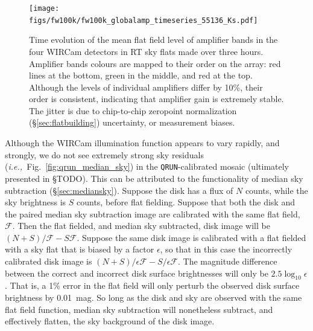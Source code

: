 \documentclass[iop]{emulateapj}
\newcommand{\ie}{\textit{i.e.,~}}
\newcommand{\todo}[1]{\textcolor{RedOrange}{#1}} %
\newcommand{\Fig}[1]{Fig.~\ref{fig:#1}}  %
\newcommand{\Sec}[1]{\S\ref{sec:#1}}  %
\begin{document}
\begin{figure}[t]
\centering
\texttt{[image: figs/fw100k/fw100k\_globalamp\_timeseries\_55136\_Ks.pdf]}
\caption{Time evolution of the mean flat field level of amplifier bands in the four WIRCam detectors in RT sky flats made over three hours. Amplifier bands colours are mapped to their order on the array: red lines at the bottom, green in the middle, and red at the top. Although the levels of individual amplifiers differ by 10\%, their order is consistent, indicating that amplifier gain is extremely stable. The jitter is due to chip-to-chip zeropoint normalization (\Sec{flatbuilding}) uncertainty, or measurement biases.}
\label{fig:fw100k_globalamp_timeseries_55136_Ks}
\end{figure}

Although the WIRCam illumination function appears to vary rapidly, and strongly, we do not see extremely strong sky residuals (\ie \Fig{qrun_median_sky}) in the \texttt{QRUN}-calibrated mosaic (ultimately presented in \todo{\S TODO}).
This can be attributed to the functionality of median sky subtraction (\Sec{mediansky}).
Suppose the disk has a flux of $N$ counts, while the sky brightness is $S$ counts, before flat fielding.
Suppose that both the disk and the paired median sky subtraction image are calibrated with the same flat field, $\mathcal{F}$.
Then the flat fielded, and median sky subtracted, disk image will be $(N + S)/\mathcal{F} - S \mathcal{F}$.
Suppose the same disk image is calibrated with a flat fielded with a sky flat that is biased by a factor $\epsilon$, so that in this case the incorrectly calibrated disk image is $(N + S) / \epsilon \mathcal{F} - S / \epsilon \mathcal{F}$.
The magnitude difference between the correct and incorrect disk surface brightnesses will only be $2.5 \log_{10} \epsilon$.
That is, a 1\% error in the flat field will only perturb the observed disk surface brightness by 0.01~mag.
So long as the disk and sky are observed with the same flat field function, median sky subtraction will nonetheless subtract, and effectively flatten, the sky background of the disk image.
\end{document}

